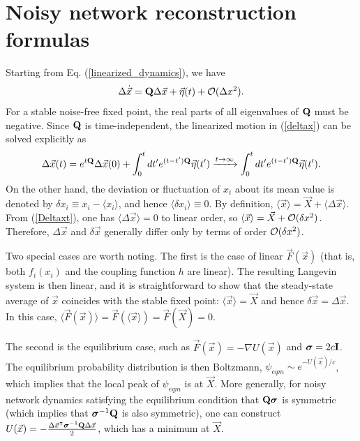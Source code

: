 \section{Noisy network reconstruction formulas}
\quad Starting from Eq. (\ref{linearized_dynamics}), we have
\begin{equation}
\Delta{\dot{\vec x}} ={\bf Q}\Delta{\vec x} +{\vec \eta}(t)+{\cal O}(\Delta x ^2)\label{deltax}.
\end{equation}
For a stable noise-free fixed point, the real parts of all eigenvalues of ${\bf Q}$ must be negative. Since ${\bf Q}$ is time-independent, the linearized motion in (\ref{deltax}) can be solved explicitly as
\begin{equation}
    \Delta{\vec x}(t)=e^{ t{\bf Q}}\Delta{\vec x}(0)+\int^t_0 dt' e^{ (t-t'){\bf Q}}{\vec \eta}(t') \xrightarrow{t\to\infty}\int^t_0 dt' e^{ (t-t'){\bf Q}}{\vec \eta}(t').\label{Deltaxt}
\end{equation}
On the other hand, the deviation or fluctuation of $x_i$ about its mean value is denoted by $\delta x_i\equiv x_i- \langle x_i \rangle$, and hence $\langle \delta x_i \rangle\equiv 0$. By definition, $\langle \vec x\rangle =\vec X + \langle \Delta \vec x\rangle$. From (\ref{Deltaxt}), one has $\langle \Delta \vec x\rangle=0$ to linear order, so $\langle \vec x\rangle =\vec X +{\cal O}(\delta x ^2)$. Therefore, $\Delta{\vec x}$ and $\delta{\vec x}$ generally differ only by terms of order ${\cal O}(\delta x ^2)$.\par
Two special cases are worth noting. The first is the case of linear ${\vec{ F}}({\vec x})$ (that is, both $f_i(x_i)$ and the coupling function $h$ are linear). The resulting Langevin system is then linear, and it is straightforward to show that the steady-state average of ${\vec x}$ coincides with the stable fixed point: $\langle \vec x\rangle={\vec X}$ and hence $\delta{\vec x}=\Delta{\vec x}$. In this case, $\langle {\vec { F}}({\vec x})\rangle = {\vec { F}}(\langle{\vec x}\rangle)= {\vec { F}}({\vec X})=0$.\par
The second is the equilibrium case, such as ${\vec{ F}}({\vec x})=-\nabla U({\vec x})$ and $\boldsymbol{\sigma}=2c{\bf I}$. The equilibrium probability distribution is then Boltzmann, $\psi_{eqm}\sim e^{-U({\vec x})/c}$, which implies that the local peak of $\psi_{eqm}$ is at ${\vec X}$. More generally, for noisy network dynamics satisfying the equilibrium condition that ${\bf Q}\boldsymbol{\sigma}$ is symmetric (which implies that $\boldsymbol{\sigma}^{-1}{\bf Q}$ is also symmetric), one can construct $ U({\vec x})=-\frac{\Delta{\vec x}^\intercal\boldsymbol{\sigma}^{-1}{\bf Q}\Delta{\vec x}}{2}$, which has a minimum at ${\vec X}$.

